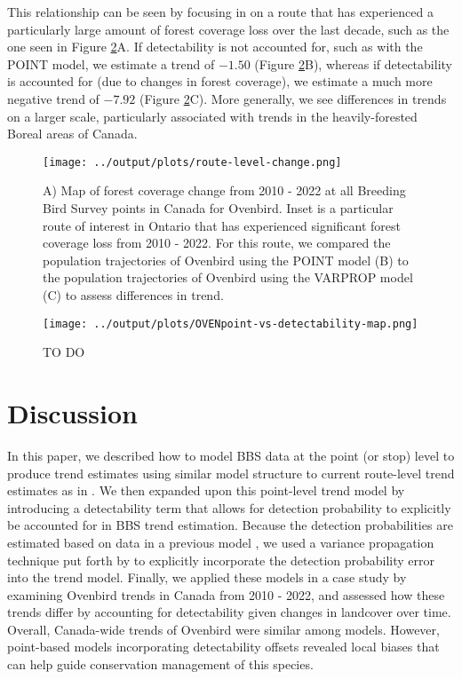 \documentclass[12pt]{article}
\begin{document}
\par This relationship can be seen by focusing in on a route that has experienced a particularly large amount of forest coverage loss over the last decade, such as the one seen in Figure \ref{fig:route-change}A. 
If detectability is not accounted for, such as with the POINT model, we estimate a trend of $-1.50$ (Figure \ref{fig:route-change}B), whereas if detectability is accounted for (due to changes in forest coverage), we estimate a much more negative trend of $-7.92$ (Figure \ref{fig:route-change}C).
More generally, we see differences in trends on a larger scale, particularly associated with trends in the heavily-forested Boreal areas of Canada.

\begin{figure}[h]
	\texttt{[image: ../output/plots/route-level-change.png]}
	\caption{A) Map of forest coverage change from 2010 - 2022 at all Breeding Bird Survey points in Canada for Ovenbird. Inset is a particular route of interest in Ontario that has experienced significant forest coverage loss from 2010 - 2022. For this route, we compared the population trajectories of Ovenbird using the POINT model (B) to the population trajectories of Ovenbird using the VARPROP model (C) to assess differences in trend.}
	\label{fig:route-change}
\end{figure}

\begin{figure}[h]
	\texttt{[image: ../output/plots/OVENpoint-vs-detectability-map.png]}
	\caption{TO DO}
	\label{fig:route-change}
\end{figure}

\section{Discussion}

\par In this paper, we described how to model BBS data at the point (or stop) level to produce trend estimates using similar model structure to current route-level trend estimates as in \citet{smith_spatially_2023}.
We then expanded upon this point-level trend model by introducing a detectability term that allows for detection probability to explicitly be accounted for in BBS trend estimation.
Because the detection probabilities are estimated based on data in a previous model \citep{edwards_point_2023}, we used a variance propagation technique put forth by \citet{bravington_variance_2021} to explicitly incorporate the detection probability error into the trend model.
Finally, we applied these models in a case study by examining Ovenbird trends in Canada from 2010 - 2022, and assessed how these trends differ by accounting for detectability given changes in landcover over time.
Overall, Canada-wide trends of Ovenbird were similar among models.
However, point-based models incorporating detectability offsets revealed local biases that can help guide conservation management of this species.
\end{document}
